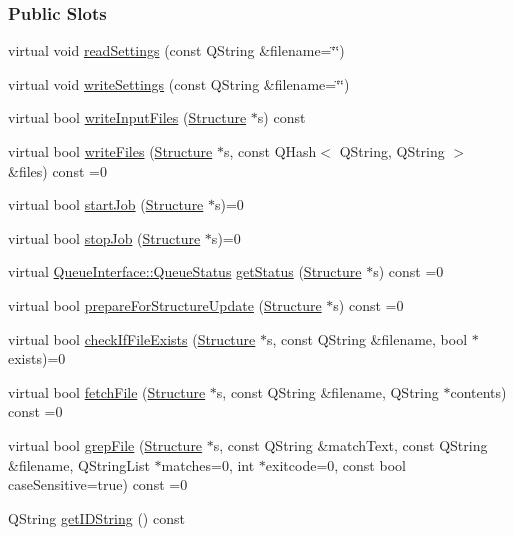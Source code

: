 \subsubsection*{Public Slots}
\begin{DoxyCompactItemize}
\item 
virtual void \hyperlink{classGlobalSearch_1_1QueueInterface_a6f52e6123a0963a759a18e01804360ac}{read\+Settings} (const Q\+String \&filename=\char`\"{}\char`\"{})
\item 
virtual void \hyperlink{classGlobalSearch_1_1QueueInterface_a2ca92e5132d02e5eda672d2904779a3c}{write\+Settings} (const Q\+String \&filename=\char`\"{}\char`\"{})
\item 
virtual bool \hyperlink{classGlobalSearch_1_1QueueInterface_a4f0c5df9f5945c9c5a64cdf47b7834fa}{write\+Input\+Files} (\hyperlink{classGlobalSearch_1_1Structure}{Structure} $\ast$s) const 
\item 
virtual bool \hyperlink{classGlobalSearch_1_1QueueInterface_a8850904265fa4f397aa37fce9b548829}{write\+Files} (\hyperlink{classGlobalSearch_1_1Structure}{Structure} $\ast$s, const Q\+Hash$<$ Q\+String, Q\+String $>$ \&files) const =0
\item 
virtual bool \hyperlink{classGlobalSearch_1_1QueueInterface_a70a6aa40639e36575a90ffd17c595f55}{start\+Job} (\hyperlink{classGlobalSearch_1_1Structure}{Structure} $\ast$s)=0
\item 
virtual bool \hyperlink{classGlobalSearch_1_1QueueInterface_ab61d5cc09730f42f225571f6865ed383}{stop\+Job} (\hyperlink{classGlobalSearch_1_1Structure}{Structure} $\ast$s)=0
\item 
virtual \hyperlink{classGlobalSearch_1_1QueueInterface_a08dcf06d1b99f6333472470490ca9a6d}{Queue\+Interface\+::\+Queue\+Status} \hyperlink{classGlobalSearch_1_1QueueInterface_a8294808ad1612f2b6fccd932a9d7fd35}{get\+Status} (\hyperlink{classGlobalSearch_1_1Structure}{Structure} $\ast$s) const =0
\item 
virtual bool \hyperlink{classGlobalSearch_1_1QueueInterface_ac3a92214ace255b679951f5a5ef9a11c}{prepare\+For\+Structure\+Update} (\hyperlink{classGlobalSearch_1_1Structure}{Structure} $\ast$s) const =0
\item 
virtual bool \hyperlink{classGlobalSearch_1_1QueueInterface_ab9ea013a587a597749be3efbe035eff8}{check\+If\+File\+Exists} (\hyperlink{classGlobalSearch_1_1Structure}{Structure} $\ast$s, const Q\+String \&filename, bool $\ast$exists)=0
\item 
virtual bool \hyperlink{classGlobalSearch_1_1QueueInterface_ac8af84b05ee61d8c9bb6f1648cc5f221}{fetch\+File} (\hyperlink{classGlobalSearch_1_1Structure}{Structure} $\ast$s, const Q\+String \&filename, Q\+String $\ast$contents) const =0
\item 
virtual bool \hyperlink{classGlobalSearch_1_1QueueInterface_ad3a350e2b2cd0ac746b3c3c22e8606a5}{grep\+File} (\hyperlink{classGlobalSearch_1_1Structure}{Structure} $\ast$s, const Q\+String \&match\+Text, const Q\+String \&filename, Q\+String\+List $\ast$matches=0, int $\ast$exitcode=0, const bool case\+Sensitive=true) const =0
\item 
Q\+String \hyperlink{classGlobalSearch_1_1QueueInterface_a105fbf7ab1565d55cae260269d4be627}{get\+I\+D\+String} () const 
\end{DoxyCompactItemize}
